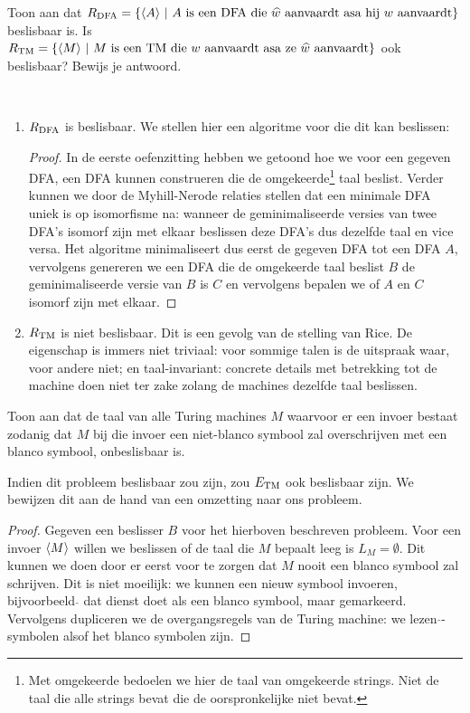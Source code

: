 \documentclass[a4paper]{article}
\begin{document}
\begin{question}
Toon aan dat $R_{\rm DFA} = \{ \langle A \rangle \ | \ \text{$A$ is een DFA die $\widehat{w}$ aanvaardt asa hij $w$ aanvaardt} \}$ beslisbaar is. Is $R_{\rm TM} = \{ \langle M \rangle \ | \ \text{$M$ is een TM die $w$ aanvaardt asa ze $\widehat{w}$ aanvaardt} \}$ ook beslisbaar? Bewijs je antwoord.
\begin{answer}~~
\begin{enumerate}
  \item $R_{\rm DFA}$ is beslisbaar. We stellen hier een algoritme voor die dit kan beslissen:
  \begin{proof}
  In de eerste oefenzitting hebben we getoond hoe we voor een gegeven DFA, een DFA kunnen construeren die de omgekeerde\footnote{Met omgekeerde bedoelen we hier de taal van omgekeerde strings. Niet de taal die alle strings bevat die de oorspronkelijke niet bevat.} taal beslist. Verder kunnen we door de Myhill-Nerode relaties stellen dat een minimale DFA uniek is op isomorfisme na: wanneer de geminimaliseerde versies van twee DFA's isomorf zijn met elkaar beslissen deze DFA's dus dezelfde taal en vice versa. Het algoritme minimaliseert dus eerst de gegeven DFA tot een DFA $A$, vervolgens genereren we een DFA die de omgekeerde taal beslist $B$ de geminimaliseerde versie van $B$ is $C$ en vervolgens bepalen we of $A$ en $C$ isomorf zijn met elkaar.
  \end{proof}
  \item $R_{\rm TM}$ is niet beslisbaar. Dit is een gevolg van de stelling van Rice. De eigenschap is immers niet triviaal: voor sommige talen is de uitspraak waar, voor andere niet; en taal-invariant: concrete details met betrekking tot de machine doen niet ter zake zolang de machines dezelfde taal beslissen.
\end{enumerate}

\end{answer}
\end{question}

\begin{question}
Toon aan dat de taal van alle Turing machines $M$ waarvoor er een invoer bestaat zodanig dat $M$ bij die invoer een niet-blanco symbool zal overschrijven met een blanco symbool, onbeslisbaar is.
\begin{answer}
Indien dit probleem beslisbaar zou zijn, zou $E_{\rm TM}$ ook beslisbaar zijn. We bewijzen dit aan de hand van een omzetting naar ons probleem.
\begin{proof}
Gegeven een beslisser $B$ voor het hierboven beschreven probleem. Voor een invoer $\left\langle M \right\rangle$ willen we beslissen of de taal die $M$ bepaalt leeg is $L_M=\emptyset$. Dit kunnen we doen door er eerst voor te zorgen dat $M$ nooit een blanco symbool zal schrijven. Dit is niet moeilijk: we kunnen een nieuw symbool invoeren, bijvoorbeeld $\hat{}$ dat dienst doet als een blanco symbool, maar gemarkeerd. Vervolgens dupliceren we de overgangsregels van de Turing machine: we lezen $\hat{}$-symbolen alsof het blanco symbolen zijn.
\end{proof}
\end{answer}
\end{question}
\end{document}
